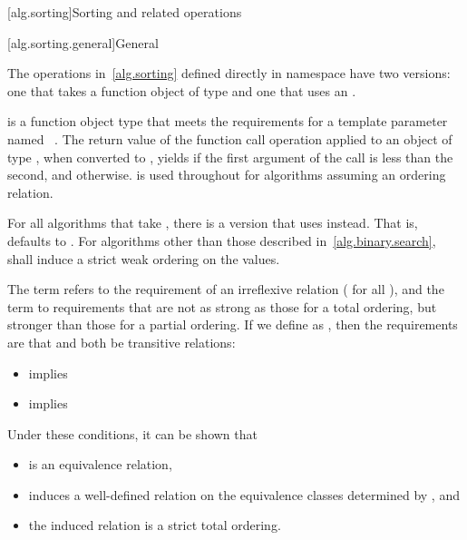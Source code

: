 [alg.sorting]{Sorting and related operations}

[alg.sorting.general]{General}

\pnum
The operations in~\ref{alg.sorting} defined directly in namespace 
have two versions:
one that takes a function object of type  and
one that uses an .

\pnum
{} is a function object type
that meets the requirements for a template parameter
named ~.
The return value of the function call operation
applied to an object of type ,
when converted to ,
yields 
if the first argument of the call is less than the second, and
 otherwise.
 is used throughout
for algorithms assuming an ordering relation.

\pnum
For all algorithms that take ,
there is a version that uses  instead.
That is,  defaults to .
For algorithms other than those described in~\ref{alg.binary.search},
 shall induce a strict weak ordering on the values.

\pnum
The term  refers to the requirement
of an irreflexive relation ( for all ),
and the term  to requirements
that are not as strong as those for a total ordering,
but stronger than those for a partial ordering.
If we define  as ,
then the requirements are that  and 
both be transitive relations:
\begin{itemize}
\item {} implies 
\item {} implies 
\end{itemize}
\begin{note}
Under these conditions, it can be shown that
\begin{itemize}
\item
   is an equivalence relation,
\item
   induces a well-defined relation
  on the equivalence classes determined by , and
\item
  the induced relation is a strict total ordering.
\end{itemize}
\end{note}

